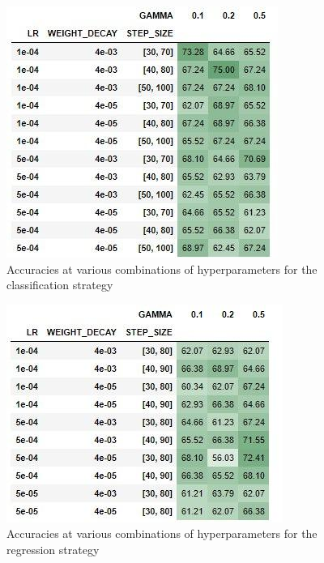 \documentclass[10pt,twocolumn,hidelinks,letterpaper]{article}
\begin{document}
\begin{figure}[t]
	\centering
	\includegraphics[width=\linewidth]{images/grid_no_reg_table.jpg}
	\caption{Accuracies at various combinations of hyperparameters for the classification strategy}
	\label{ms_grid}
\end{figure}

\begin{figure}[t]
	\centering
	\includegraphics[width=\linewidth]{images/grid_reg_table.jpg}
	\caption{Accuracies at various combinations of hyperparameters for the regression strategy}
	\label{ms_reg_grid}
\end{figure}
\end{document}
